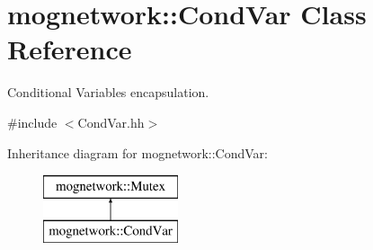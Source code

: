 \hypertarget{classmognetwork_1_1_cond_var}{\section{mognetwork\-:\-:Cond\-Var Class Reference}
\label{classmognetwork_1_1_cond_var}
}


Conditional Variables encapsulation.  




{\ttfamily \#include $<$Cond\-Var.\-hh$>$}

Inheritance diagram for mognetwork\-:\-:Cond\-Var\-:\begin{figure}[H]
\begin{center}
\leavevmode
\includegraphics[height=2.000000cm]{classmognetwork_1_1_cond_var}
\end{center}
\end{figure}
